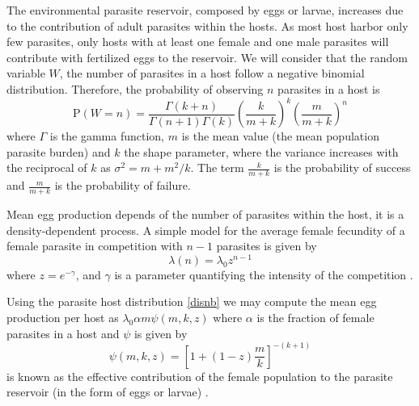 \documentclass[eng]{MMSB-class-eng}
\begin{document}
The environmental parasite reservoir, composed by eggs or larvae, increases due to the contribution of adult parasites within the hosts. As most host harbor only few parasites, only hosts with at least one female and one male parasites will contribute with fertilized eggs to the reservoir. We will consider that the random variable $W$, the number of parasites in a host follow a negative binomial distribution. 
Therefore, the probability of observing $n$ parasites in a host is
\begin{equation}\label{disnb}
\mathrm{P}(W=n)=\frac{\Gamma(k+n)}{\Gamma(n+1)\Gamma(k)}\left( \frac{k}{m+k}\right) ^{k} \left( \frac{m}{m+k}\right) ^n
\end{equation}
where $\Gamma$ is the gamma function,  
$m$ is the mean value (the mean population parasite burden) and $k$ the shape parameter, where the variance increases with the reciprocal of $k$ as $\sigma^2=m+m^2/k$. 
The term $\frac{k}{m+k}$ is the probability of success and $ \frac{m}{m+k}$ is the  probability of failure.



Mean egg production depends of the number of parasites within the host, it is a density-dependent process. 
A simple model for the average female fecundity of a female parasite in competition with $n-1$ parasites is given by 
$$\lambda(n)=\lambda_0 z^{n-1}$$ where $z=e^{-\gamma}$, and $\gamma$ is a parameter quantifying the intensity of the competition \citep{hall2000geographical}. 

Using the parasite host distribution \eqref{disnb} we may compute the mean egg production per host as \citep{lopez2022general}
$\lambda_0
\alpha m
\psi(m,k,z)$
where $\alpha$  is the fraction of female parasites in a host and $\psi$ is given by
\begin{equation}
\psi(m,k,z)=\left[ 1+(1-z)\dfrac{m}{k}\right]^{-(k+1)}
\end{equation}
is  known as the effective contribution of the female population to the parasite reservoir (in the form of eggs or larvae) \citep{churcher2006density}.
\end{document}

